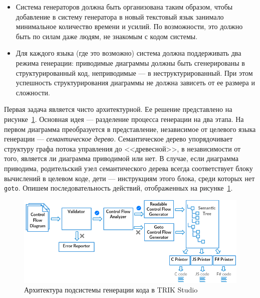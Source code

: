 \documentclass[a5paper]{article}
\begin{document}
\begin{itemize}
    \item Система генераторов должна быть организована таким образом, чтобы добавление в систему генератора в новый текстовый язык занимало минимальное количество времени и усилий. По возможности, это должно быть по силам даже людям, не знакомым с кодом системы.
    \item Для каждого языка (где это возможно) система должна поддерживать два режима генерации: приводимые диаграммы должны быть сгенерированы в структурированный код, неприводимые --- в неструктурированный. При этом успешность структурирования диаграммы не должна зависеть от ее размера и сложности.
\end{itemize}

Первая задача является чисто архитектурной. Ее решение представлено на рисунке~\ref{image:generatorsArchitecture}. Основная идея --- разделение процесса генерации на два этапа. На первом диаграмма преобразуется в представление, независимое от целевого языка генерации --- \textit{семантическое дерево}. Семантическое дерево упорядочивает структуру графа потока управления до <<древесной>>, в независимости от того, является ли диаграмма приводимой или нет. В случае, если диаграмма приводима, родительский узел семантического дерева всегда соответствует блоку вычислений в целевом коде, дети --- инструкциям этого блока, среди которых нет \texttt{goto}. Опишем последовательность действий, отображенных на рисунке~\ref{image:generatorsArchitecture}.

\begin{figure}[ht]
    \centering
    \includegraphics[width=4.5in]{TS_Generators_Architecture.png}
    \caption{Архитектура подсистемы генерации кода в TRIK Studio}
    \label{image:generatorsArchitecture}
\end{figure}
\end{document}
